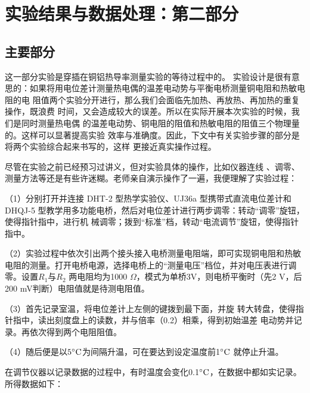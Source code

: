 \documentclass[11pt]{article}
\begin{document}
\newpage

\section{实验结果与数据处理：第二部分}
\subsection{主要部分}
这一部分实验是穿插在铜铝热导率测量实验的等待过程中的。
实验设计是很有意思的：如果将用电位差计测量热电偶的温差电动势与平衡电桥测量铜电阻和热敏电阻的电
阻值两个实验分开进行，那么我们会面临先加热、再放热、再加热的重复操作，既浪费
时间，又会造成较大的误差。所以在实际开展本次实验的时候，我们是同时测量热电偶
的温差电动势、铜电阻的阻值和热敏电阻的阻值三个物理量的。这样可以显著提高实验
效率与准确度。因此，下文中有关实验步骤的部分是将两个实验综合起来书写的，这样
更接近真实操作过程。

尽管在实验之前已经预习过讲义，但对实验具体的操作，比如仪器连线
、调零、测量方法等还是有些许迷糊。老师亲自演示操作了一遍，我便理解了实验过程：

（1）分别打开并连接 DHT-2 型热学实验仪、UJ36a 型携带式直流电位差计和 DHQJ-5 型教学用多功能电桥，然后对电位差计进行两步调零：转动“调零”旋钮，使得指针指中，进行机
械调零；拨到“标准”档，转动“电流调节”旋钮，使得指针指中。

（2）实验过程中依次引出两个接头接入电桥测量电阻端，即可实现铜电阻和热敏电阻的测量。打开电桥电源，选择电桥上的“测量电压”档位，并对电压表进行调零。设置$R_1$与$R_2$
两电阻均为1000$\,\,\Omega$，模式为单桥3V，则电桥平衡时（先2 V，后200 mV判断）电阻值就是待测电阻值。

（3）首先记录室温，将电位差计上左侧的键拨到最下面，并旋
转大转盘，使得指针指中，读出刻度盘上的读数，并与倍率（0.2）相乘，得到初始温差
电动势并记录。再依次得到两个电阻阻值。

（4）随后便是以$5^\circ \rm C$为间隔升温，可在要达到设定温度前1$^\circ \rm C$ 就停止升温。

在调节仪器以记录数据的过程中，有时温度会变化0.1$^\circ \rm C$，在数据中都如实记录。
所得数据如下：
\end{document}
